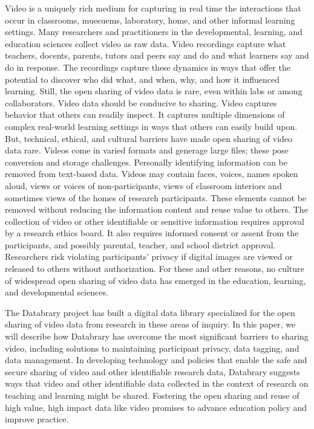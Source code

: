 \documentclass[letterpaper,man,apacite]{apa6}
\begin{document}
Video is a uniquely rich medium for capturing in real time the interactions that occur in classrooms, muesuems, laboratory, home, and other informal learning settings.
Many researchers and practitioners in the developmental, learning, and education sciences collect video as raw data.
Video recordings capture what teachers, docents, parents, tutors and peers say and do and what learners say and do in response.
The recordings capture these dynamics in ways that offer the potential to discover who did what, and when, why, and how it influenced learning.
Still, the open sharing of video data is rare, even within labs or among collaborators.
Video data should be conducive to sharing.
Video captures behavior that others can readily inspect.
It captures multiple dimensions of complex real-world learning settings in ways that others can easily build upon. But, technical, ethical, and cultural barriers have made open sharing of video data rare.
Videos come in varied formats and generage large files; these pose conversion and storage challenges.
Personally identifying information can be removed from text-based data.
Videos may contain faces, voices, names spoken aloud, views or voices of non-participants, views of classroom interiors and sometimes views of the homes of research participants. 
These elements cannot be removed without reducing the information content and reuse value to others. 
The collection of video or other identifiable or sensitive information requires approval by a research ethics board.
It also requires informed consent or assent from the participants, and possibly parental, teacher, and school district approval.
Researchers risk violating participants’ privacy if digital images are viewed or released to others without authorization.
For these and other reasons, no culture of widespread open sharing of video data has emerged in the education, learning, and developmental sciences. 

The Databrary project has built a digital data library specialized for the open sharing of video data from research in these areas of inquiry.
In this paper, we will describe how Databrary has overcome the most significant barriers to sharing video, including solutions to maintaining participant privacy, data tagging, and data management.
In developing technology and policies that enable the safe and secure sharing of video and other identifiable research data, Databrary suggests ways that video and other identifiable data collected in the context of research on teaching and learning might be shared.
Fostering the open sharing and reuse of high value, high impact data like video promises to advance education policy and improve practice.
\end{document}
